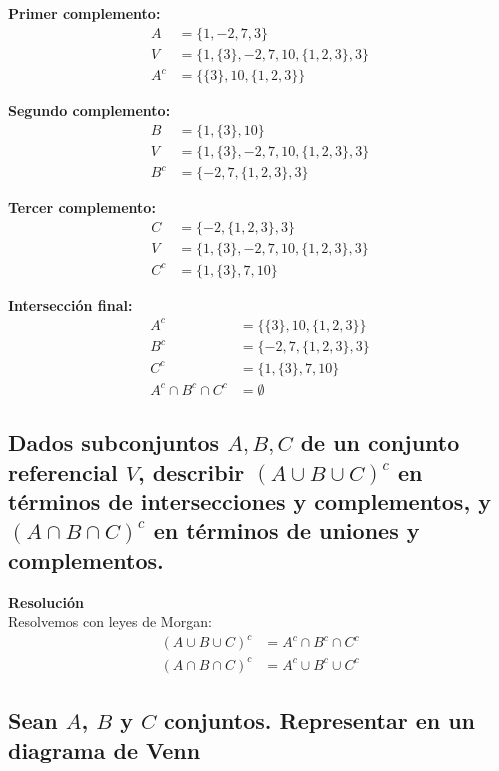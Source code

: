 \documentclass[11pt]{article}
\begin{document}
\begin{enumerate}[label=\roman*)]
    \textbf{Primer complemento:}
    \begin{align*}
        A &= \{1,-2,7,3\}\\
        V &= \{1, \{3\}, -2, 7, 10, \{1,2,3\},3\}\\
        A^{c} &= \{\{3\}, 10, \{1,2,3\}\} 
    \end{align*}
    
    \textbf{Segundo complemento:}
    \begin{align*}
        B &= \{1,\{3\}, 10\}\\
        V &= \{1, \{3\}, -2, 7, 10, \{1,2,3\},3\}\\
        B^{c} &= \{-2, 7, \{1,2,3\}, 3\}
    \end{align*}
    
    \textbf{Tercer complemento:}
    \begin{align*}
        C &= \{-2, \{1,2,3\}, 3\}\\
        V &= \{1, \{3\}, -2, 7, 10, \{1,2,3\}, 3\}\\
        C^{c} &= \{1, \{3\}, 7, 10\}
    \end{align*}

    \textbf{Intersección final:}
    \begin{align*}
        A^{c} &= \{\{3\}, 10, \{1,2,3\}\}\\
        B^{c} &= \{-2, 7, \{1,2,3\}, 3\}\\
        C^{c} &= \{1, \{3\}, 7, 10\}\\
        A^{c} \cap B^{c} \cap C^{c} &= \emptyset
    \end{align*}
\end{enumerate}

\subsection{Dados subconjuntos \(A, B, C\) de un conjunto referencial \(V\), describir 
\((A \cup B \cup C)^{c}\) en términos de intersecciones y complementos, 
y \((A \cap B \cap C)^{c}\) en términos de uniones y complementos.}

\textbf{Resolución}\\[6pt]
Resolvemos con leyes de Morgan: 
\begin{align*}
    (A \cup B \cup C)^{c} &= A^{c} \cap B^{c} \cap C^{c} \\
    (A \cap B \cap C)^{c} &= A^{c} \cup B^{c} \cup C^{c}
\end{align*}

\subsection{Sean \(A\), \(B\) y \(C\) conjuntos. Representar en un diagrama de Venn}
\end{document}
